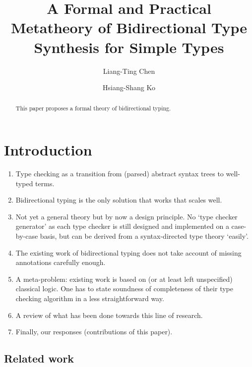 \documentclass[acmsmall,screen]{acmart}
\theoremstyle{acmdefinition}
\begin{document}
\author{Liang-Ting Chen}
\author{Hsiang-Shang Ko}


\title{A Formal and Practical Metatheory of Bidirectional Type Synthesis for Simple Types}

\begin{abstract}
  This paper proposes a formal theory of bidirectional typing.
\end{abstract}

\maketitle

\section{Introduction}\label{sec:intro}

\begin{enumerate}
  \item Type checking as a transition from (parsed) abstract syntax trees to well-typed terms.
  \item Bidirectional typing is the only solution that works that scales well.
  \item Not yet a general theory but by now a design principle.
    No `type checker generator' as each type checker is still designed and implemented on a case-by-case basis, but can be derived from a syntax-directed type theory `easily'.
  \item The existing work of bidirectional typing does not take account of missing annotations carefully enough. 
  \item A meta-problem: existing work is based on (or at least left unspecified) classical logic.
    One has to state soundness of completeness of their type checking algorithm in a less straightforward way.
  \item A review of what has been done towards this line of research.
  \item Finally, our responses (contributions of this paper).
\end{enumerate}

\subsection{Related work}
\end{document}
